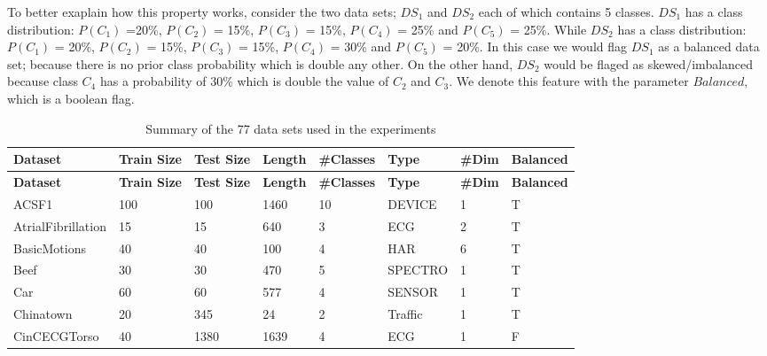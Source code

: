 To better exaplain how this property works, consider the two data sets; $DS_{1}$ and $DS_{2}$ each of which contains 5 classes.
$DS_{1}$ has a class distribution: $P(C_{1})$ =20\%, $P(C_{2})$ = 15\%, $P(C_{3})$ = 15\%, $P(C_{4})$ = 25\% and $P(C_{5})$ = 25\%.
While $DS_{2}$ has a class distribution: $P(C_{1})$ = 20\%, $P(C_{2})$ = 15\%, $P(C_{3})$ = 15\%, $P(C_{4})$ = 30\% and $P(C_{5})$ = 20\%.
In this case we would flag $DS_{1}$ as a balanced data set; because there is no prior class probability which is double any other.
On the other hand, $DS_{2}$ would be flaged as skewed/imbalanced because class $C_{4}$ has a probability of 30\% which is double the value
of $C_{2}$ and $C_{3}$. We denote this feature with the parameter $Balanced$, which is a boolean flag.

\begin{landscape}
    \begin{longtable}{|*{8}l|}
        \caption{Summary of the 77 data sets used in the experiments} \label{tab:long} \\
        \hline
        \textbf{Dataset} & \textbf{Train Size} & \textbf{Test Size} & \textbf{Length} & \textbf{\#Classes} & \textbf{Type} & \textbf{\#Dim} & \textbf{Balanced} \\ [0.5ex]
        \hline
        \endfirsthead %
        \hline
        \textbf{Dataset} & \textbf{Train Size} & \textbf{Test Size} & \textbf{Length} & \textbf{\#Classes} & \textbf{Type} & \textbf{\#Dim} & \textbf{Balanced} \\ [0.5ex]
        \hline
        \endhead %
        ACSF1 & 100 & 100 & 1460 & 10 & DEVICE & 1 & T \\[1ex]
        \hline
        AtrialFibrillation & 15 & 15 & 640 & 3 & ECG & 2 & T \\[1ex]
        \hline
        BasicMotions & 40 & 40 & 100 & 4 & HAR & 6 & T \\[1ex]
        \hline
        Beef & 30 & 30 & 470 & 5 & SPECTRO & 1 & T \\[1ex]
        \hline
        Car & 60 & 60 & 577 & 4 & SENSOR & 1 & T \\[1ex]
        \hline
        Chinatown & 20 & 345 & 24 & 2 & Traffic & 1 & T \\[1ex]
        \hline
        CinCECGTorso & 40 & 1380 & 1639 & 4 & ECG & 1 & F \\[1ex]

\end{longtable}
\end{landscape}

